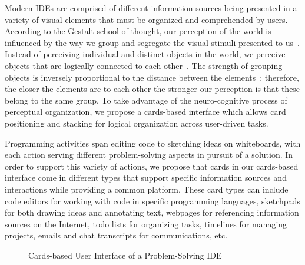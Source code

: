 \documentclass{ppig}
\begin{document}
Modern IDEs are comprised of different information sources being presented in a variety of visual elements that must be organized and comprehended by users.
According to the Gestalt school of thought, our perception of the world is influenced by the way we group and segregate the visual stimuli presented to us~\cite{kimchi2003perceptual}.
Instead of perceiving individual and distinct objects in the world, we perceive objects that are logically connected to each other~\cite{kimchi2003perceptual}.
The strength of grouping objects is inversely proportional to the distance between the elements~\cite{bergman2009peirce}; therefore, the closer the elements are to each other the stronger our perception is that these belong to the same group.
To take advantage of the neuro-cognitive process of perceptual organization, we propose a cards-based interface which allows card positioning and stacking for logical organization across user-driven tasks.

Programming activities span editing code to sketching ideas on whiteboards, with each action serving different problem-solving aspects in pursuit of a solution.
In order to support this variety of actions, we propose that cards in our cards-based interface come in different types that support specific information sources and interactions while providing a common platform.
These card types can include code editors for working with code in specific programming languages, sketchpads for both drawing ideas and annotating text, webpages for referencing information sources on the Internet, todo lists for organizing tasks, timelines for managing projects, emails and chat transcripts for communications, etc.

\begin{figure}[h!]
	\caption{Cards-based User Interface of a Problem-Solving IDE}
	\label{mockup}
	\vspace*{-1.5\baselineskip}
\end{figure}
\end{document}
